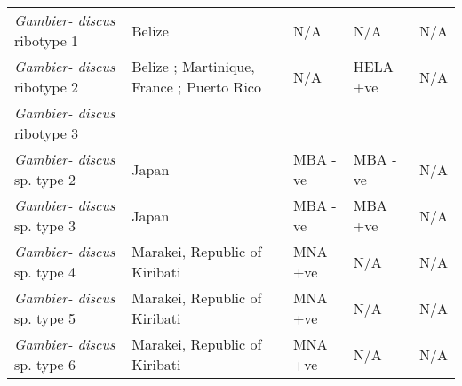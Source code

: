 \documentclass[12pt]{article}
\begin{document}
\begin{longtable}{  p{2cm}  p{5.5cm}  p{2.3cm}  p{2.3cm}  p{2.3cm}  }
	\emph{Gambier- discus} ribotype 1 & Belize \cite{litaker2010global} & N/A & N/A & N/A \\
	\emph{Gambier- discus} ribotype 2 & Belize \cite{litaker2010global}; Martinique, France \cite{litaker2010global}; Puerto Rico \cite{holland2013differences} & N/A & HELA +ve \cite{holland2013differences} & N/A\\
	\emph{Gambier- discus} ribotype 3 & & & & \\ %
	\emph{Gambier- discus} sp. type 2 & Japan \cite{nishimura2013genetic} & MBA -ve \cite{nishimura2013genetic} & MBA -ve \cite{nishimura2013genetic} & N/A \\
	\emph{Gambier- discus} sp. type 3 & Japan \cite{nishimura2013genetic} & MBA -ve \cite{nishimura2013genetic} & MBA +ve \cite{nishimura2013genetic} & N/A \\
	\emph{Gambier- discus} sp. type 4 &  Marakei, Republic of Kiribati \cite{xu2014distribution}& MNA +ve \cite{xu2014distribution} & N/A & N/A \\
	\emph{Gambier- discus} sp. type 5 & Marakei, Republic of Kiribati \cite{xu2014distribution}& MNA +ve \cite{xu2014distribution} & N/A & N/A \\
	\emph{Gambier- discus} sp. type 6 & Marakei, Republic of Kiribati \cite{xu2014distribution}& MNA +ve \cite{xu2014distribution} & N/A & N/A \\
	\end{longtable}
	\FloatBarrier
\end{document}
